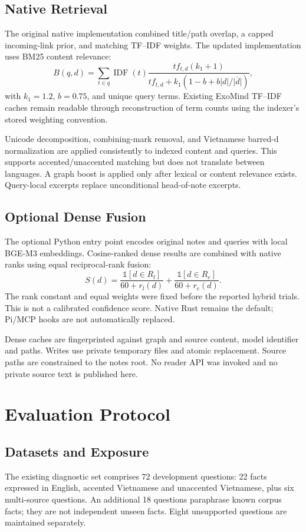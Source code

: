 \documentclass[conference]{IEEEtran}
\begin{document}
\subsection{Native Retrieval}
The original native implementation combined title/path overlap, a capped incoming-link prior, and matching TF--IDF weights. The updated implementation uses BM25 content relevance:
\begin{equation}
B(q,d)=\sum_{t\in q} \operatorname{IDF}(t)
\frac{tf_{t,d}(k_1+1)}{tf_{t,d}+k_1(1-b+b|d|/\overline{|d|})},
\end{equation}
with $k_1=1.2$, $b=0.75$, and unique query terms. Existing ExoMind TF--IDF caches remain readable through reconstruction of term counts using the indexer's stored weighting convention.

Unicode decomposition, combining-mark removal, and Vietnamese barred-d normalization are applied consistently to indexed content and queries. This supports accented/unaccented matching but does not translate between languages. A graph boost is applied only after lexical or content relevance exists. Query-local excerpts replace unconditional head-of-note excerpts.

\subsection{Optional Dense Fusion}
The optional Python entry point encodes original notes and queries with local BGE-M3 embeddings. Cosine-ranked dense results are combined with native ranks using equal reciprocal-rank fusion:
\begin{equation}
S(d)=\frac{\mathbb{1}[d\in R_l]}{60+r_l(d)}+
\frac{\mathbb{1}[d\in R_e]}{60+r_e(d)}.
\end{equation}
The rank constant and equal weights were fixed before the reported hybrid trials. This is not a calibrated confidence score. Native Rust remains the default; Pi/MCP hooks are not automatically replaced.

Dense caches are fingerprinted against graph and source content, model identifier and paths. Writes use private temporary files and atomic replacement. Source paths are constrained to the notes root. No reader API was invoked and no private source text is published here.

\section{Evaluation Protocol}
\subsection{Datasets and Exposure}
The existing diagnostic set comprises 72 development questions: 22 facts expressed in English, accented Vietnamese and unaccented Vietnamese, plus six multi-source questions. An additional 18 questions paraphrase known corpus facts; they are not independent unseen facts. Eight unsupported questions are maintained separately.
\end{document}
